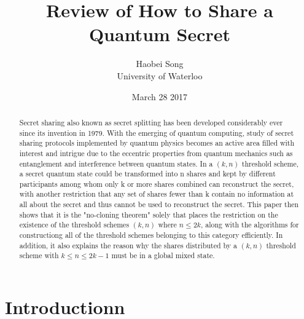 \documentclass[12pt]{article}
\title{\textbf{Review of How to Share a Quantum Secret \cite{review}}} \author{Haobei Song\\University of Waterloo}
\date{March 28 2017}
\begin{document}

\maketitle
\newpage


\begin{abstract}
	Secret sharing also known as secret splitting has been developed considerably ever since its invention in 1979. With the emerging of quantum computing, study of secret sharing protocols implemented by quantum physics becomes an active area filled with interest and intrigue due to the eccentric properties from quantum mechanics such as entanglement and interference between quantum states.
	In a $(k,n)$ threshold scheme, a secret quantum state could be transformed into n shares and kept by different participants among whom only k or more shares combined can reconstruct the secret, with another restriction that any set of shares fewer than k contain no information at all about the secret and thus cannot be used to reconstruct the secret.
	This paper then shows that it is the "no-cloning theorem" solely that places the restriction on the existence of the threshold schemes $(k, n)$ where $n \le 2k$, along with the algorithms for constructiong all of the threshold schemes belonging to this category efficiently. In addition, it also explains the reason why the shares distributed by a $(k,n)$ threshold scheme with $k \leq n \le 2k-1$ must be in a global mixed state.
	

\end{abstract}
\section{Introductionn}
\end{document}
